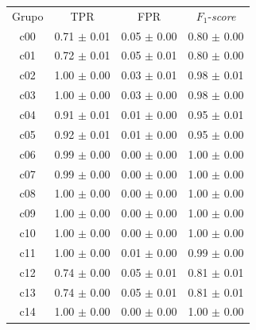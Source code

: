 \begin{table}[ht]
    \centering
    \small
    \begin{tabularx}{\linewidth}{|c|CCC|}
        \hline
        Grupo & TPR                         & FPR                         & $F_{1}$-\textit{score}      \\
        c00   & \num{0.71} $\pm$ \num{0.01} & \num{0.05} $\pm$ \num{0.00} & \num{0.80} $\pm$ \num{0.00} \\ \hline
        c01   & \num{0.72} $\pm$ \num{0.01} & \num{0.05} $\pm$ \num{0.01} & \num{0.80} $\pm$ \num{0.00} \\ \hline
        c02   & \num{1.00} $\pm$ \num{0.00} & \num{0.03} $\pm$ \num{0.01} & \num{0.98} $\pm$ \num{0.01} \\ \hline
        c03   & \num{1.00} $\pm$ \num{0.00} & \num{0.03} $\pm$ \num{0.00} & \num{0.98} $\pm$ \num{0.00} \\ \hline
        c04   & \num{0.91} $\pm$ \num{0.01} & \num{0.01} $\pm$ \num{0.00} & \num{0.95} $\pm$ \num{0.01} \\ \hline
        c05   & \num{0.92} $\pm$ \num{0.01} & \num{0.01} $\pm$ \num{0.00} & \num{0.95} $\pm$ \num{0.00} \\ \hline
        c06   & \num{0.99} $\pm$ \num{0.00} & \num{0.00} $\pm$ \num{0.00} & \num{1.00} $\pm$ \num{0.00} \\ \hline
        c07   & \num{0.99} $\pm$ \num{0.00} & \num{0.00} $\pm$ \num{0.00} & \num{1.00} $\pm$ \num{0.00} \\ \hline
        c08   & \num{1.00} $\pm$ \num{0.00} & \num{0.00} $\pm$ \num{0.00} & \num{1.00} $\pm$ \num{0.00} \\ \hline
        c09   & \num{1.00} $\pm$ \num{0.00} & \num{0.00} $\pm$ \num{0.00} & \num{1.00} $\pm$ \num{0.00} \\ \hline
        c10   & \num{1.00} $\pm$ \num{0.00} & \num{0.00} $\pm$ \num{0.00} & \num{1.00} $\pm$ \num{0.00} \\ \hline
        c11   & \num{1.00} $\pm$ \num{0.00} & \num{0.01} $\pm$ \num{0.00} & \num{0.99} $\pm$ \num{0.00} \\ \hline
        c12   & \num{0.74} $\pm$ \num{0.00} & \num{0.05} $\pm$ \num{0.01} & \num{0.81} $\pm$ \num{0.01} \\ \hline
        c13   & \num{0.74} $\pm$ \num{0.00} & \num{0.05} $\pm$ \num{0.01} & \num{0.81} $\pm$ \num{0.01} \\ \hline
        c14   & \num{1.00} $\pm$ \num{0.00} & \num{0.00} $\pm$ \num{0.00} & \num{1.00} $\pm$ \num{0.00} \\ \hline

\end{tabularx}
\end{table}
